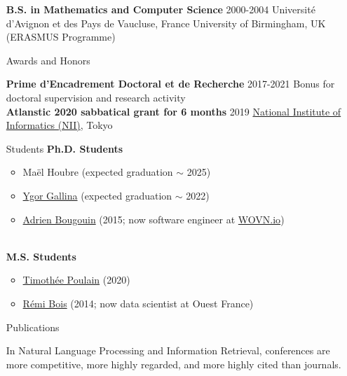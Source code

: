 \documentclass[11pt,a4paper]{article}
\begin{document}
\begin{itemize}
\textbf{B.S. in Mathematics and Computer Science} \hfill 2000-2004 \newline
Université d'Avignon et des Pays de Vaucluse, France \newline
University of Birmingham, UK (ERASMUS Programme)

\item[Awards and Honors]

\textbf{Prime d'Encadrement Doctoral et de Recherche} \hfill 2017-2021 \newline
Bonus for doctoral supervision and research activity \\[-.5cm]

\textbf{Atlanstic 2020 sabbatical grant for 6 months} \hfill 2019 \newline
\href{https://www.nii.ac.jp/en/}{National Institute of Informatics (NII)}, Tokyo


\item[Students]
\textbf{Ph.D. Students}
\begin{itemize}[nosep,topsep=-0.2cm,leftmargin=!,labelsep*=.3cm,label=$\Yright$]
\item Maël Houbre (expected graduation $\sim$ 2025)
\item \href{https://github.com/ygorg}{Ygor Gallina}
      (expected graduation $\sim$ 2022) 
\item \href{http://adrien-bougouin.github.io/}{Adrien Bougouin} 
      (2015; now software engineer at \href{https://wovn.io/}{WOVN.io}) 
\end{itemize}~\\[-.2cm]
%
\textbf{M.S. Students}
\begin{itemize}[nosep,topsep=-0.2cm,leftmargin=!,labelsep*=.3cm,label=$\Yright$]
\item \href{https://github.com/poulain-tim}{Timothée Poulain} (2020)
\item \href{https://www.ledatablog.com/}{Rémi Bois} (2014; now data scientist at Ouest France) 
\end{itemize}

\item[Publications]

In Natural Language Processing and Information Retrieval, conferences are more 
competitive, more highly regarded, and more highly cited than journals.



\end{itemize}
\end{document}
